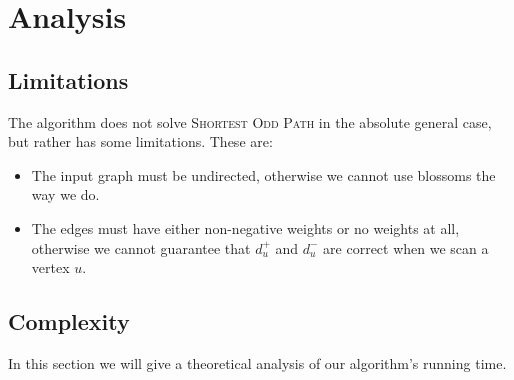\section{Analysis}
\subsection{Limitations}
The algorithm does not solve \textsc{Shortest Odd Path} in the absolute general case, but rather has some limitations. These are: 
\begin{itemize}
    \item The input graph must be undirected, otherwise we cannot use blossoms the way we do.
    \item The edges must have either non-negative weights or no weights at all, otherwise we cannot guarantee that $d^+_u$ and $d^-_u$ are correct when we scan a vertex $u$.
\end{itemize}

\subsection{Complexity}
In this section we will give a theoretical analysis of our algorithm's running time.

